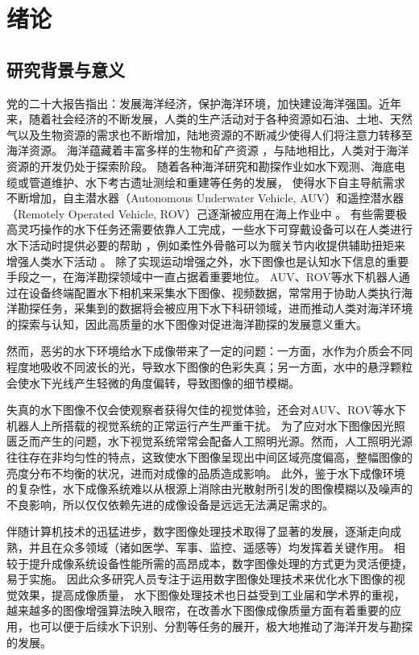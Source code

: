 
\chapter{绪论}

\section{研究背景与意义}
党的二十大报告指出：发展海洋经济，保护海洋环境，加快建设海洋强国。近年来，随着社会经济的不断发展，人类的生产活动对于各种资源如石油、土地、天然气以及生物资源的需求也不断增加，陆地资源的不断减少使得人们将注意力转移至海洋资源。
海洋蕴藏着丰富多样的生物和矿产资源 \cite{ocean_energy}，与陆地相比，人类对于海洋资源的开发仍处于探索阶段。
随着各种海洋研究和勘探作业如水下观测、海底电缆或管道维护、水下考古遗址测绘和重建等任务的发展，
使得水下自主导航需求不断增加，自主潜水器（Autonomous Underwater Vehicle, AUV）和遥控潜水器（Remotely Operated Vehicle, ROV）己逐渐被应用在海上作业中 \cite{auv}\cite{rov}。
有些需要极高灵巧操作的水下任务还需要依靠人工完成，一些水下可穿戴设备可以在人类进行水下活动时提供必要的帮助 \cite{Xia2022}，例如柔性外骨骼可以为髋关节内收提供辅助扭矩来增强人类水下活动 \cite{Xia2023}。
除了实现运动增强之外，水下图像也是认知水下信息的重要手段之一，在海洋勘探领域中一直占据着重要地位。\cite{underwater_perception}
AUV、ROV等水下机器人通过在设备终端配置水下相机来采集水下图像、视频数据，常常用于协助人类执行海洋勘探任务，采集到的数据将会被应用下水下科研领域，进而推动人类对海洋环境的探索与认知，因此高质量的水下图像对促进海洋勘探的发展意义重大。

然而，恶劣的水下环境给水下成像带来了一定的问题：一方面，水作为介质会不同程度地吸收不同波长的光，导致水下图像的色彩失真；另一方面，水中的悬浮颗粒会使水下光线产生轻微的角度偏转，导致图像的细节模糊。

失真的水下图像不仅会使观察者获得欠佳的视觉体验，还会对AUV、ROV等水下机器人上所搭载的视觉系统的正常运行产生严重干扰。
为了应对水下图像因光照匮乏而产生的问题，水下视觉系统常常会配备人工照明光源。然而，人工照明光源往往存在非均匀性的特点，这致使水下图像呈现出中间区域亮度偏高，整幅图像的亮度分布不均衡的状况，进而对成像的品质造成影响。
此外，鉴于水下成像环境的复杂性，水下成像系统难以从根源上消除由光散射所引发的图像模糊以及噪声的不良影响，所以仅仅依赖先进的成像设备是远远无法满足需求的。

伴随计算机技术的迅猛进步，数字图像处理技术取得了显著的发展，逐渐走向成熟，并且在众多领域（诸如医学、军事、监控、遥感等）均发挥着关键作用。
相较于提升成像系统设备性能所需的高昂成本，数字图像处理的方式更为灵活便捷，易于实施。
因此众多研究人员专注于运用数字图像处理技术来优化水下图像的视觉效果，提高成像质量，
水下图像处理技术也日益受到工业届和学术界的重视，越来越多的图像增强算法映入眼帘，在改善水下图像成像质量方面有着重要的应用，也可以便于后续水下识别、分割等任务的展开，极大地推动了海洋开发与勘探的发展。

